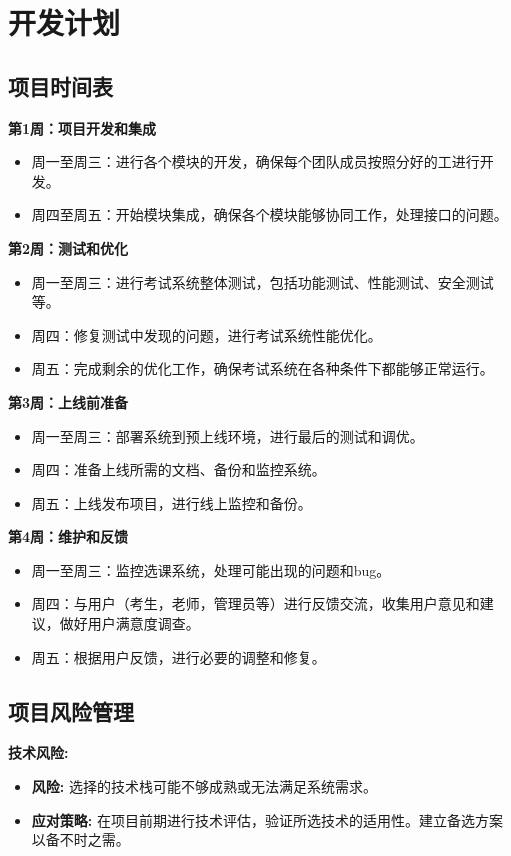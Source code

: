 \documentclass{article}
\begin{document}
\section{开发计划}
\subsection{项目时间表}
\textbf{第1周：项目开发和集成}
\begin{itemize}
    \item 周一至周三：进行各个模块的开发，确保每个团队成员按照分好的工进行开发。
    \item 周四至周五：开始模块集成，确保各个模块能够协同工作，处理接口的问题。
\end{itemize}

\textbf{第2周：测试和优化}
\begin{itemize}
    \item 周一至周三：进行考试系统整体测试，包括功能测试、性能测试、安全测试等。
    \item 周四：修复测试中发现的问题，进行考试系统性能优化。
    \item 周五：完成剩余的优化工作，确保考试系统在各种条件下都能够正常运行。
\end{itemize}

\textbf{第3周：上线前准备}
\begin{itemize}
    \item 周一至周三：部署系统到预上线环境，进行最后的测试和调优。
    \item 周四：准备上线所需的文档、备份和监控系统。
    \item 周五：上线发布项目，进行线上监控和备份。
\end{itemize}

\textbf{第4周：维护和反馈}
\begin{itemize}
    \item 周一至周三：监控选课系统，处理可能出现的问题和bug。
    \item 周四：与用户（考生，老师，管理员等）进行反馈交流，收集用户意见和建议，做好用户满意度调查。
    \item 周五：根据用户反馈，进行必要的调整和修复。
\end{itemize}
\subsection{项目风险管理}
\textbf{技术风险:}
\begin{itemize}
    \item \textbf{风险:} 选择的技术栈可能不够成熟或无法满足系统需求。
    \item \textbf{应对策略:} 在项目前期进行技术评估，验证所选技术的适用性。建立备选方案以备不时之需。
\end{itemize}
\end{document}
